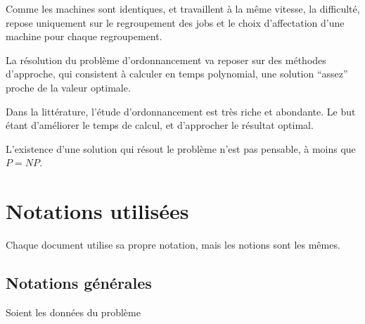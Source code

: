 \documentclass[a4paper,12pt]{report}
\theoremstyle{plain}				%
\theoremstyle{definition}				%
\begin{document}
Comme les machines sont identiques, et travaillent à la même vitesse, 
la difficulté, repose uniquement sur le regroupement des jobs et le choix d'affectation d'une machine pour chaque regroupement.
 
La résolution du problème d'ordonnancement va reposer sur des méthodes
d'approche, qui consistent à calculer en
temps polynomial, une solution ``assez'' proche de la valeur optimale.

Dans la littérature, l'étude d'ordonnancement est très riche et
abondante.
Le but étant d'améliorer le temps de calcul, et d'approcher le
résultat optimal.

L'existence d'une solution qui résout le
problème n'est pas pensable, à moins que $P = NP$.



\section{Notations utilisées}

Chaque document utilise sa propre notation, mais les notions sont les mêmes.


\subsection{Notations générales}
Soient les données du problème
\end{document}
